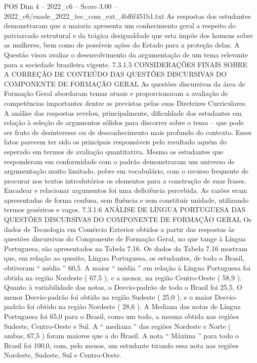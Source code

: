 \begin{textsample}{POS Dim 4 – 2022\_c6 – Score 3.00 – 2022\_c6/enade\_2022\_tec\_com\_ext\_4bf6f451b1.txt}
As respostas dos estudantes demonstraram que a maioria apresenta um conhecimento geral a respeito do patriarcado estrutural e da trágica desigualdade que esta impõe dos homens sobre as mulheres, bem como de possíveis ações do Estado para a proteção delas.
A Questão visou avaliar o desenvolvimento da argumentação de um tema relevante para a sociedade brasileira vigente. 7.3.1.5 CONSIDERAÇÕES FINAIS SOBRE A CORREÇÃO DE CONTEÚDO DAS QUESTÕES DISCURSIVAS DO COMPONENTE DE FORMAÇÃO GERAL As questões discursivas da área de Formação Geral abordaram temas atuais e proporcionaram a avaliação de competências importantes dentre as previstas pelas suas Diretrizes Curriculares.
A análise das respostas revelou, principalmente, dificuldade dos estudantes em relação à seleção de argumentos sólidos para discorrer sobre o tema – que pode ser fruto de desinteresse ou de desconhecimento mais profundo do contexto.
Esses fatos parecem ter sido os principais responsáveis pelo resultado aquém do esperado em termos de avaliação quantitativa.
Mesmo os estudantes que responderam em conformidade com o padrão demonstraram um universo de argumentação muito limitado, pobre em vocabulário, com o recurso frequente de procurar nos textos introdutórios os elementos para a construção de suas frases.
Encadear e relacionar argumentos foi uma deficiência percebida.
As razões eram apresentadas de forma confusa, sem fluência e sem constituir unidade, utilizando termos genéricos e vagos. 7.3.1.6 ANÁLISE DE LÍNGUA PORTUGUESA DAS QUESTÕES DISCURSIVAS DO COMPONENTE DE FORMAÇÃO GERAL Os dados de Tecnologia em Comércio Exterior obtidos a partir das respostas às questões discursivas do Componente de Formação Geral, no que tange à Língua Portuguesa, são apresentados na Tabela 7.16.
Os dados da Tabela 7.16 mostram que, em relação ao quesito, Língua Portuguesa, os estudantes, de todo o Brasil, obtiveram “ média ” 60,5.
A maior “ média ” em relação à Língua Portuguesa foi obtida na região Nordeste ( 67,5 ), e a menor, na região Centro-Oeste ( 58,9 ).
Quanto à variabilidade das notas, o Desvio-padrão de todo o Brasil foi 25,5.
O menor Desvio-padrão foi obtido na região Sudeste ( 25,0 ), e o maior Desvio-padrão foi obtido na região Nordeste ( 28,6 ).
A Mediana das notas de Língua Portuguesa foi 65,0 para o Brasil, como um todo, a mesma obtida nas regiões Sudeste, Centro-Oeste e Sul.
A “ mediana ” das regiões Nordeste e Norte ( ambas, 67,5 ) foram maiores que a do Brasil.
A nota “ Máxima ” para todo o Brasil foi 100,0, com, pelo menos, um estudante tirando essa nota nas regiões Nordeste, Sudeste, Sul e Centro-Oeste.

\end{textsample}
